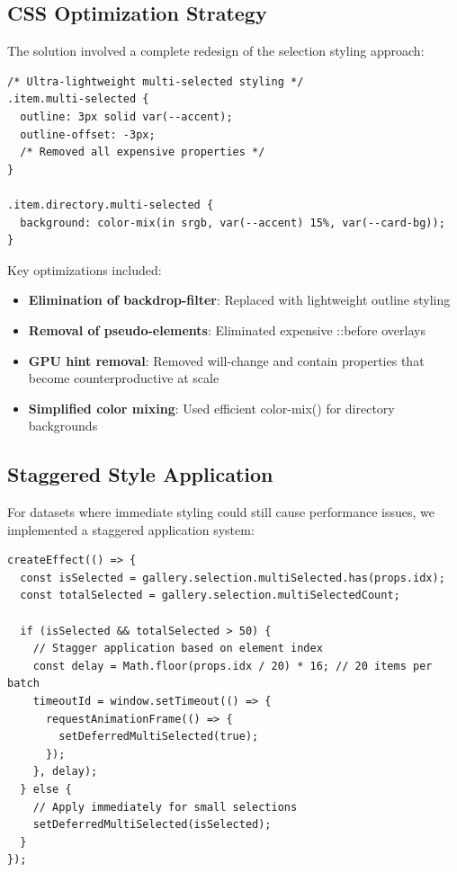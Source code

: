 \documentclass[10pt]{article}
\begin{document}
\subsection{CSS Optimization Strategy}

The solution involved a complete redesign of the selection styling approach:

\begin{lstlisting}[caption={Optimized CSS Implementation}]
/* Ultra-lightweight multi-selected styling */
.item.multi-selected {
  outline: 3px solid var(--accent);
  outline-offset: -3px;
  /* Removed all expensive properties */
}

.item.directory.multi-selected {
  background: color-mix(in srgb, var(--accent) 15%, var(--card-bg));
}
\end{lstlisting}

Key optimizations included:
\begin{itemize}
    \item \textbf{Elimination of backdrop-filter}: Replaced with lightweight outline styling
    \item \textbf{Removal of pseudo-elements}: Eliminated expensive ::before overlays
    \item \textbf{GPU hint removal}: Removed will-change and contain properties that become counterproductive at scale
    \item \textbf{Simplified color mixing}: Used efficient color-mix() for directory backgrounds
\end{itemize}

\subsection{Staggered Style Application}

For datasets where immediate styling could still cause performance issues, we implemented a staggered application system:

\begin{lstlisting}[caption={Deferred Style Application Algorithm}]
createEffect(() => {
  const isSelected = gallery.selection.multiSelected.has(props.idx);
  const totalSelected = gallery.selection.multiSelectedCount;
  
  if (isSelected && totalSelected > 50) {
    // Stagger application based on element index
    const delay = Math.floor(props.idx / 20) * 16; // 20 items per batch
    timeoutId = window.setTimeout(() => {
      requestAnimationFrame(() => {
        setDeferredMultiSelected(true);
      });
    }, delay);
  } else {
    // Apply immediately for small selections
    setDeferredMultiSelected(isSelected);
  }
});
\end{lstlisting}
\end{document}
